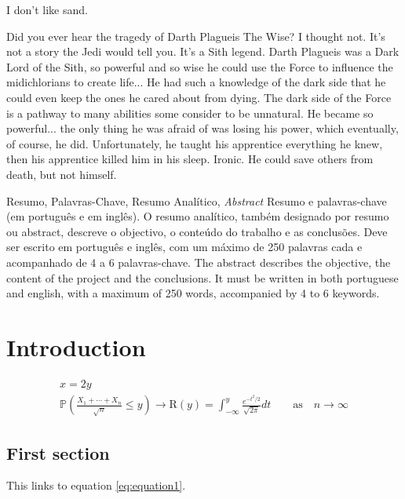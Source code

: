 \documentclass[portuguese]{ist-thesis}
\begin{document}
\makecover

\begin{dedication}
	I don't like sand.
\end{dedication}

\begin{acknowledgements}
	Did you ever hear the tragedy of Darth Plagueis The Wise? I thought not. It's not a story the Jedi would tell you. It's a Sith legend. Darth Plagueis was a Dark Lord of the Sith, so powerful and so wise he could use the Force to influence the midichlorians to create life... He had such a knowledge of the dark side that he could even keep the ones he cared about from dying. The dark side of the Force is a pathway to many abilities some consider to be unnatural. He became so powerful... the only thing he was afraid of was losing his power, which eventually, of course, he did. Unfortunately, he taught his apprentice everything he knew, then his apprentice killed him in his sleep. Ironic. He could save others from death, but not himself.
\end{acknowledgements}

\begin{tabstract}{Resumo, Palavras-Chave, Resumo Analítico, \textit{Abstract}}
	Resumo e palavras-chave (em português e em inglês). O resumo analítico, também designado por resumo ou abstract, descreve o objectivo, o conteúdo do trabalho e as conclusões. Deve ser escrito em português e inglês, com um máximo de 250 palavras cada e acompanhado de 4 a 6 palavras-chave.
	The abstract describes the objective, the content of the project and the conclusions. It must be written in both portuguese and english, with a maximum of 250 words, accompanied by 4 to 6 keywords.
\end{tabstract}

\tableofcontents

\listoffigures

\listoftables

\mainstart

\chapter{Introduction}

\begin{gather}
	x = 2y \label{eq:equation1}\\
	\mathbb{P}\left(\frac{X_1 + \cdots + X_n}{\sqrt{n}} \leq y\right) \rightarrow \mathrm{R}(y) = \int_{-\infty}^{y} \frac{e^{-t^2/2}}{\sqrt{2\pi}}dt \qquad \mathrm{as} \quad n \rightarrow \infty
\end{gather}

\section{First section}

This links to equation \ref{eq:equation1}.

\lipsum
\end{document}
